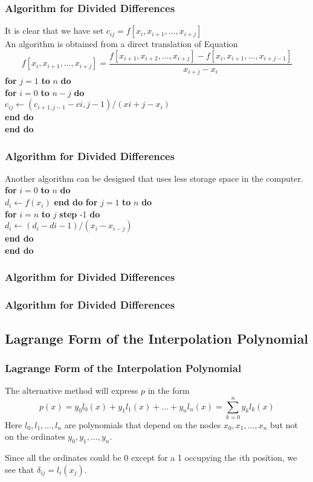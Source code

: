\documentclass[notheorems,mathserif,table,compress]{beamer}  %
\begin{document}
\begin{frame}
  \frametitle{Algorithm for Divided Differences}
  It is clear that we have set $c_{ij}=f[x_i,x_{i+1},\ldots,x_{i+j}]$\\
  An algorithm is obtained from a direct translation of Equation 
  \[ f[x_i,x_{i+1},\ldots,x_{i+j}]=\frac{f[x_{i+1},x_{i+2},\ldots,x_{i+j}]-f[x_i,x_{i+1},\ldots,x_{i+j-1}]}{x_{i+j}-x_i} \]
  \textbf{for} $j=1$ \textbf{to} $n$ \textbf{do}\\
  \qquad \textbf{for} $i=0$ \textbf{to} $n-j$ \textbf{do}\\
  \qquad \qquad $c_{ij}\gets (c_{i+1,j-1}-c{i,j-1})/(x{i+j}-x_i)$\\
  \qquad \textbf{end do}\\
  \textbf{end do}
\end{frame}


\begin{frame}
  \frametitle{Algorithm for Divided Differences}
  Another algorithm can be designed that uses less storage space in the computer.\\
  \textbf{for} $i=0$ \textbf{to} $n$ \textbf{do}\\
  \qquad $d_i \gets f(x_i)$
  \textbf{end do}
  \textbf{for} $j=1$ \textbf{to} $n$ \textbf{do}\\
  \qquad \textbf{for} $i=n$ \textbf{to} $j$ \textbf{step} -1 \textbf{do}\\
  \qquad \qquad $d_i \gets (d_i-d{i-1})/(x_i-x_{i-j})$\\
  \qquad \textbf{end do}\\
  \textbf{end do}
\end{frame} 


\begin{frame}
  \frametitle{Algorithm for Divided Differences}
  
\end{frame}


\begin{frame}
  \frametitle{Algorithm for Divided Differences}
  
\end{frame}


\subsection{Lagrange Form of the Interpolation Polynomial}


\begin{frame}
  \frametitle{Lagrange Form of the Interpolation Polynomial}
  The alternative method will express $p$ in the form
  \begin{displaymath}
  p(x)=y_0l_0(x)+y_1l_1(x)+\ldots+y_nl_n(x)=\sum_{k=0}^n y_kl_k(x)
  \end{displaymath}
  Here $l_0,l_1,\ldots,l_n$ are polynomials that depend on the nodes $x_0,x_1,\ldots,x_n$ but not on the ordinates $y_0,y_1,\ldots,y_n$.
  
  Since all the ordinates could be 0 except for a 1 occupying the $i$th position, we see that $\delta_{ij}=l_i(x_j)$.
\end{frame}
\end{document}
